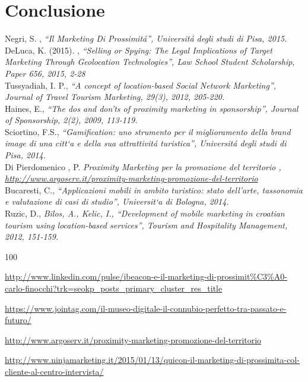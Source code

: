 \chapter*{Conclusione}

\begin{thebibliography}{100}
 Negri, S. ,\emph{ “Il Marketing Di Prossimit\'a”, Universit\'a degli studi di Pisa, 2015.}\\[0.2cm]
 DeLuca, K. (2015). , \emph{“Selling or Spying: The Legal Implications of Target Marketing
Through Geolocation Technologies”, Law School Student Scholarship, Paper 656,
2015, 2-28}\\[0.2cm]
 Tussyadiah, I. P., \emph{“A concept of location-based Social Network Marketing”, Journal
of Travel Tourism Marketing, 29(3), 2012, 205-220.}\\[0.2cm]
 Haines, E.,\emph{ “The dos and don’ts of proximity marketing in sponsorship”, Journal of Sponsorship, 2(2), 2009, 113-119.}\\[0.2cm]
 Sciortino, F.S., \emph{“Gamification: uno strumento per il miglioramento della brand image di una citt`a e della sua attrattivit\'a turistica”, Universit\'a degli studi di Pisa, 2014.}\\[0.2cm]
 Di Pierdomenico , P. \emph{ Proximity Marketing per la promozione del territorio , \url{http://www.argoserv.it/proximity-marketing-promozione-del-territorio}}\\[0.2cm]
 Bucaresti, C., \emph{ “Applicazioni mobili in ambito turistico: stato dell’arte, tassonomia
e valutazione di casi di studio”, Universit`a di Bologna, 2014.}\\[0.2cm]
 Ruzic, D., \emph{ Bilos, A., Kelic, I., “Development of mobile marketing in croatian tourism using location-based services”, Tourism and Hospitality Management, 2012, 151-159.}\\[0.2cm]

\end{thebibliography}

\begin{thesitography}{100}

\url{http://www.linkedin.com/pulse/ibeacon-e-il-marketing-di-prossimit%C3%A0-carlo-finocchi?trk=seokp_posts_primary_cluster_res_title}

\url{https://www.jointag.com/il-museo-digitale-il-connubio-perfetto-tra-passato-e-futuro/}

\url{http://www.argoserv.it/proximity-marketing-promozione-del-territorio}

\url{http://www.ninjamarketing.it/2015/01/13/quicon-il-marketing-di-prossimita-col-cliente-al-centro-intervista/}

\end{thesitography}


